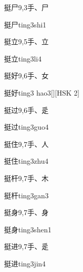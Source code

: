 \begin{entry}{挺尸}{9,3}{⼿、⼫}
  \begin{phonetics}{挺尸}{ting3shi1}
  \end{phonetics}
\end{entry}

\begin{entry}{挺立}{9,5}{⼿、⽴}
  \begin{phonetics}{挺立}{ting3li4}
  \end{phonetics}
\end{entry}

\begin{entry}{挺好}{9,6}{⼿、⼥}
  \begin{phonetics}{挺好}{ting3 hao3}[][HSK 2]
  \end{phonetics}
\end{entry}

\begin{entry}{挺过}{9,6}{⼿、⾡}
  \begin{phonetics}{挺过}{ting3guo4}
  \end{phonetics}
\end{entry}

\begin{entry}{挺住}{9,7}{⼿、⼈}
  \begin{phonetics}{挺住}{ting3zhu4}
  \end{phonetics}
\end{entry}

\begin{entry}{挺杆}{9,7}{⼿、⽊}
  \begin{phonetics}{挺杆}{ting3gan3}
  \end{phonetics}
\end{entry}

\begin{entry}{挺身}{9,7}{⼿、⾝}
  \begin{phonetics}{挺身}{ting3shen1}
  \end{phonetics}
\end{entry}

\begin{entry}{挺进}{9,7}{⼿、⾡}
  \begin{phonetics}{挺进}{ting3jin4}
  \end{phonetics}
\end{entry}

